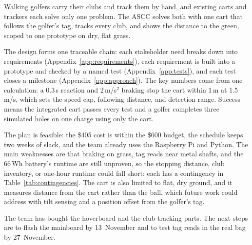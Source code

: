 
\label{sec:conclusion}

Walking golfers carry their clubs and track them by hand, and existing carts and trackers each solve only one problem. The \ac{ASCC} solves both with one cart that follows the golfer's tag, tracks every club, and shows the distance to the green, scoped to one prototype on dry, flat grass.

The design forms one traceable chain: each stakeholder need breaks down into requirements (Appendix~\ref{app:requirements}), each requirement is built into a prototype and checked by a named test (Appendix~\ref{app:tests}), and each test closes a milestone (Appendix~\ref{app:approach}). The key numbers come from one calculation: a 0.3\,s reaction and 2\,m/s$^2$ braking stop the cart within 1\,m at 1.5\,m/s, which sets the speed cap, following distance, and detection range. Success means the integrated cart passes every test and a golfer completes three simulated holes on one charge using only the cart.

The plan is feasible: the \$405 cost is within the \$600 budget, the schedule keeps two weeks of slack, and the team already uses the Raspberry Pi and Python. The main weaknesses are that braking on grass, tag reads near metal shafts, and the 66\,Wh battery's runtime are still unproven, so the stopping distance, club inventory, or one-hour runtime could fall short; each has a contingency in Table~\ref{tab:contingencies}. The cart is also limited to flat, dry ground, and it measures distance from the cart rather than the ball, which future work could address with tilt sensing and a position offset from the golfer's tag.

The team has bought the hoverboard and the club-tracking parts. The next steps are to flash the mainboard by 13~November and to test tag reads in the real bag by 27~November.
